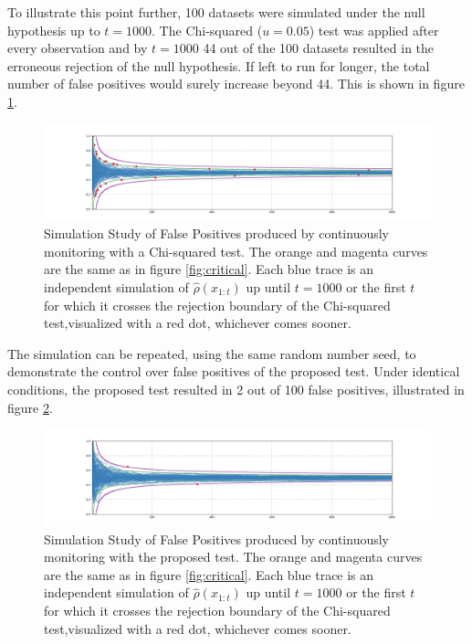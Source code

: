 \documentclass[11pt]{article}
\begin{document}
  To illustrate this point further, 100 datasets were simulated under the null hypothesis up to $t=1000$.
The Chi-squared ($u=0.05$) test was applied after every observation and by $t=1000$ 44 out of the 100 datasets resulted in the erroneous rejection of the null hypothesis.
If left to run for longer, the total number of false positives would surely increase beyond 44.
This is shown in figure \ref{fig:chi_fp}.
  \begin{figure}[h!]
  \centering
  \includegraphics[scale=0.35]{images/chi_fp.png}
  \caption{Simulation Study of False Positives produced by continuously monitoring with a Chi-squared test.
The orange and magenta curves are the same as in figure \ref{fig:critical}.
Each blue trace is an independent simulation of $\hat{\rho}(x_{1:t})$ up until $t=1000$ or the first $t$ for which it crosses the rejection boundary of the Chi-squared test,visualized with a red dot, whichever comes sooner.
}
    \label{fig:chi_fp}
  \end{figure}
  The simulation can be repeated, using the same random number seed, to demonstrate the control over false positives of the proposed test.
Under identical conditions, the proposed test resulted in 2 out of 100 false positives, illustrated in figure \ref{fig:ssrm_fp}.
    \begin{figure}[H]
  \centering
  \includegraphics[scale=0.35]{images/ssrm_fp.png}
  \caption{Simulation Study of False Positives produced by continuously monitoring with the proposed test.
The orange and magenta curves are the same as in figure \ref{fig:critical}.
Each blue trace is an independent simulation of $\hat{\rho}(x_{1:t})$ up until $t=1000$ or the first $t$ for which it crosses the rejection boundary of the Chi-squared test,visualized with a red dot, whichever comes sooner.
}
    \label{fig:ssrm_fp}
  \end{figure}
\end{document}

